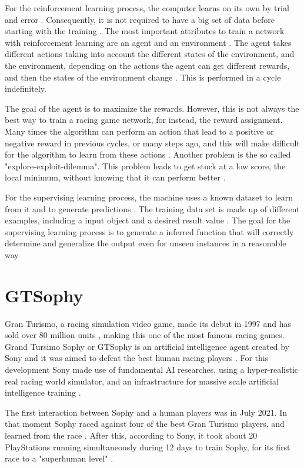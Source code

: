 \documentclass[conference]{IEEEtran}
\begin{document}
For the reinforcement learning process, the computer learns on its own by trial and error \cite{racingpdf}. Consequently, it is not required to have a big set of data before starting with the training \cite{racingpdf}. The most important attributes to train a network with reinforcement learning are an agent and an environment \cite{racingpdf}. The agent takes different actions taking into account the different states of the environment, and the environment, depending on the actions the agent can get different rewards, and then the states of the environment change \cite{racingpdf}. This is performed in a cycle indefinitely. 

The goal of the agent is to maximize the rewards. However, this is not always the best way to train a racing game network, for instead, the reward assignment. Many times the algorithm can perform an action that lead to a positive or negative reward in previous cycles, or many steps ago, and this will make difficult for the algorithm to learn from these actions \cite{racingpdf}. Another problem is the so called "explore-exploit-dilemma". This problem leads to get stuck at a low score, the local minimum, without knowing that it can perform better \cite{racingpdf}.

For the supervising learning process, the machine uses a known dataset to learn from it and to generate predictions \cite{racingpdf}. The training data set is made up of different examples, including a input object and a desired result value \cite{racingpdf}. The goal for the supervising learning process is to generate a inferred function that will correctly determine and generalize the output even for unseen instances in a reasonable way \cite{racingpdf}  

\section{GTSophy}

Gran Turismo, a racing simulation video game, made its debut in 1997 and has sold over 80 million units \cite{sony}, making this one of the most famous racing games. Grand Tursimo Sophy or GTSophy is an artificial intelligence agent created by Sony and it was aimed to defeat the best human racing players \cite{sony}. For this development Sony made use of fundamental AI researches, using a hyper-realistic real racing world simulator, and an infrastructure for massive scale artificial intelligence training \cite{sony}.

The first interaction between Sophy and a human players was in July 2021. In that moment Sophy raced against four of the best Gran Turismo players, and learned from the race \cite{sony}. After this, according to Sony, it took about 20 PlayStations running simultaneously during 12 days to train Sophy, for its first race to a "superhuman level" \cite{sony}.
\end{document}
